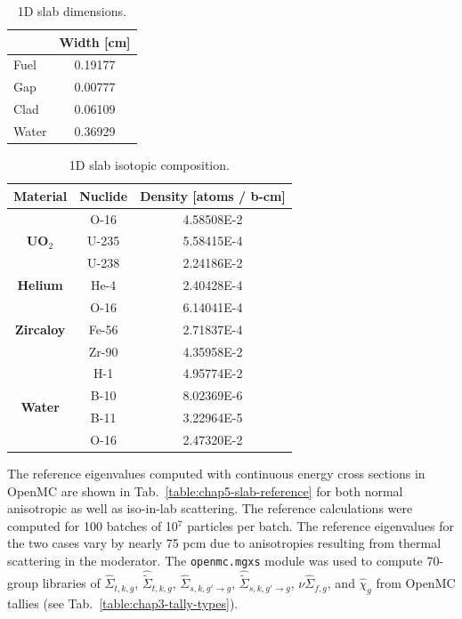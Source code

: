 \begin{table}[h!]
  \centering
  \caption[1D slab dimensions]{1D slab dimensions.}
  \small
  \label{table:chap5-slab-widths} 
  \vspace{6pt}
  \begin{tabular}{l c}
  \toprule
  \rowcolor{lightgray}
  \multicolumn{1}{c}{\bf Material} &
  \multicolumn{1}{c}{\bf Width [cm]} \\
  \midrule
  Fuel &  0.19177 \\
  Gap &   0.00777 \\
  Clad &  0.06109 \\
  Water & 0.36929 \\
  \bottomrule
\end{tabular}
\end{table}

\begin{table}[h!]
  \centering
  \caption[1D slab isotopic composition]{1D slab isotopic composition.}
  \small
  \label{table:chap5-slab-isotopes} 
  \vspace{6pt}
  \begin{tabular}{c c c}
  \toprule
  \rowcolor{lightgray}
  {\bf Material} &
  {\bf Nuclide} &
  {\bf Density [atoms / b-cm]} \\
  \midrule
  \multirow{3}{*}{\bf UO$_2$} & O-16 &  4.58508E-2 \\
  & U-235 & 5.58415E-4 \\
  & U-238 & 2.24186E-2 \\
  \midrule
  \multirow{1}{*}{\bf Helium} & He-4 & 2.40428E-4 \\
  \midrule
  \multirow{3}{*}{\bf Zircaloy} & O-16 &  6.14041E-4 \\
  & Fe-56 & 2.71837E-4 \\
  & Zr-90 & 4.35958E-2 \\
  \midrule
  \multirow{4}{*}{\bf Water} & H-1 &  4.95774E-2 \\
  & B-10 & 8.02369E-6 \\
  & B-11 & 3.22964E-5 \\
  & O-16 & 2.47320E-2 \\
  \bottomrule
\end{tabular}
\end{table}

The reference eigenvalues computed with continuous energy cross sections in OpenMC are shown in Tab.~\ref{table:chap5-slab-reference} for both normal anisotropic as well as iso-in-lab scattering. The reference calculations were computed for 100 batches of 10$^{7}$ particles per batch. The reference eigenvalues for the two cases vary by nearly 75 \ac{pcm} due to anisotropies resulting from thermal scattering in the moderator. The \texttt{openmc.mgxs} module was used to compute 70-group libraries of $\hat{\Sigma}_{t,k,g}$, $\hat{\tilde{\Sigma}}_{t,k,g}$, $\hat{\Sigma}_{s,k,g'\rightarrow g}$, $\hat{\tilde{\Sigma}}_{s,k,g'\rightarrow g}$, $\nu\hat{\Sigma}_{f,g}$, and $\hat{\chi}_{g}$ from OpenMC tallies (see Tab.~\ref{table:chap3-tally-types}).

